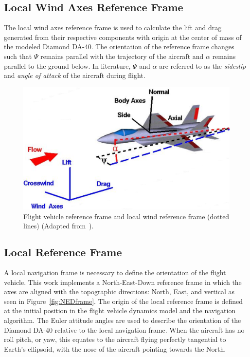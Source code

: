 \documentclass[12pt]{report}
\begin{document}
\subsection{Local Wind Axes Reference Frame}
The local wind axes reference frame is used to calculate the lift and drag generated from their respective components with origin at the center of mass of the modeled Diamond DA-40. The orientation of the reference frame changes such that \(\Psi \) remains parallel with the trajectory of the aircraft and \(\alpha \) remains parallel to the ground below. In literature, \( \Psi \) and \(\alpha \) are referred to as the \textit{sideslip} and \textit{angle of attack} of the aircraft during flight.

\begin{figure}[!ht]\label{fig:windframe}
  \centering
  \includegraphics[width=\linewidth]{Figures/windaxes.png}
  \caption{Flight vehicle reference frame and local wind reference frame (dotted lines) (Adapted from~\cite{ForceBalanceCoordinates}).}
\end{figure}

\subsection{Local Reference Frame}
A local navigation frame is necessary to define the orientation of the flight vehicle. This work implements a North-East-Down reference frame in which the axes are aligned with the topographic directions: North, East, and vertical as seen in Figure~\ref{fig:NEDframe}. The origin of the local reference frame is defined at the initial position in the flight vehicle dynamics model and the navigation algorithm. The Euler attitude angles are used to describe the orientation of the Diamond DA-40 relative to the local navigation frame. When the aircraft has no roll pitch, or yaw, this equates to the aircraft flying perfectly tangential to Earth's ellipsoid, with the nose of the aircraft pointing towards the North.
\end{document}
